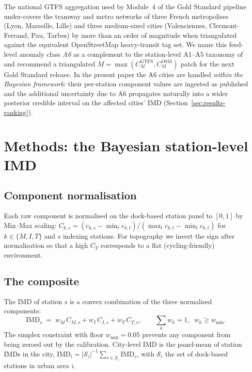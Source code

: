 \documentclass[11pt,a4paper]{article}
\newcommand{\IMD}{\mathrm{IMD}}
\begin{document}
The national GTFS aggregation used by Module~4 of the Gold
Standard pipeline under-covers the tramway and metro networks
of three French metropolises (Lyon, Marseille, Lille) and three
medium-sized cities (Valenciennes, Clermont-Ferrand, Pau,
Tarbes) by more than an order of magnitude when triangulated
against the equivalent OpenStreetMap heavy-transit tag set. We
name this feed-level anomaly class \emph{A6} as a complement to
the station-level A1--A5 taxonomy of \citet{Fosse2026gold} and
recommend a triangulated $M = \max(C_M^{\mathrm{GTFS}},
C_M^{\mathrm{OSM}})$ patch for the next Gold Standard release.
In the present paper the A6 cities are handled \emph{within the
Bayesian framework}: their per-station component values are
ingested as published and the additional uncertainty due to A6
propagates naturally into a wider posterior credible interval
on the affected cities' IMD (Section~\ref{sec:results-ranking}).

\section{Methods: the Bayesian station-level IMD}
\label{sec:methods}

\subsection{Component normalisation}

Each raw component is normalised on the dock-based station
panel to $[0, 1]$ by Min--Max scaling:
$C_{k,s} = (c_{k,s} - \min_t c_{k,t}) / (\max_t c_{k,t} -
\min_t c_{k,t})$ for $k \in \{M, I, T\}$ and $s$ indexing
stations. For topography we invert the sign after normalisation
so that a high $C_T$ corresponds to a flat (cycling-friendly)
environment.

\subsection{The composite}

The IMD of station $s$ is a convex combination of the three
normalised components:
\begin{equation}
\IMD_s \;=\; w_M\,C_{M,s} + w_I\,C_{I,s} + w_T\,C_{T,s},
\qquad
\sum_k w_k = 1,\;\; w_k \geq w_{\min}.
\label{eq:imd-station}
\end{equation}
The simplex constraint with floor $w_{\min} = 0.05$ prevents
any component from being zeroed out by the calibration.
City-level IMD is the panel-mean of station IMDs in the city,
$\IMD_i = |\mathcal{S}_i|^{-1} \sum_{s \in \mathcal{S}_i}
\IMD_s$, with $\mathcal{S}_i$ the set of dock-based stations
in urban area $i$.
\end{document}
